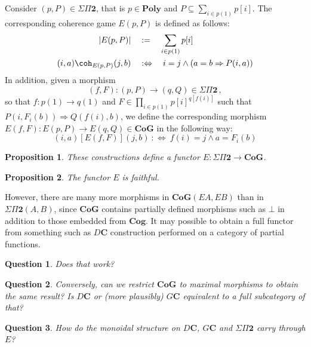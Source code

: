 \documentclass{article}
\newtheorem{proposition}{Proposition}
\newtheorem{question}{Question}
\begin{document}
Consider $(p, P) \in \Sigma \Pi \mathbf{2}$,
that is $p \in \mathbf{Poly}$
and $P \subseteq \sum_{i \in p(1)} p[i]$.
The corresponding coherence game
$E(p, P)$
is defined as follows:
\begin{align*}
  |E (p, P)| \quad &:= \quad \sum_{i \in p(1)} p[i] \\
  (i, a) \coh_{E (p, P)} (j, b) \quad &:\Leftrightarrow\quad
    i = j \wedge (a = b \Rightarrow P(i, a))
\end{align*}
In addition,
given a morphism
\[ (f, F) : (p, P) \rightarrow (q, Q) \in \Sigma\Pi\mathbf{2}\,, \]
so that $f : p(1) \rightarrow q(1)$
and $F \in \prod_{i \in p(1)} p[i]^{q[f(i)]}$
such that $P(i, F_i(b)) \Rightarrow Q(f(i), b)$,
we define the corresponding morphism
$E (f, F) : E (p, P) \rightarrow E (q, Q) \in \mathbf{CoG}$
in the following way:
\[
  (i, a) \mathrel{[E (f, F)]} (j, b)
    \::\Leftrightarrow\:
    f(i) = j \wedge a = F_i(b)
\]

\begin{proposition}
These constructions define a functor
$E : \Sigma\Pi\mathbf{2} \rightarrow \mathbf{CoG}$.
\end{proposition}

\begin{proposition}
The functor $E$ is faithful.
\end{proposition}

However,
there are many more morphisms in $\mathbf{CoG}(E A, E B)$
than in $\Sigma\Pi\mathbf{2}(A, B)$,
since $\mathbf{CoG}$ contains partially defined morphisms
such as $\bot$ in addition to those embedded from $\mathbf{Cog}$.
It may possible to obtain a full functor
from something such as $D \mathbf{C}$ construction
performed on a category of partial functions.

\begin{question}
Does that work?
\end{question}

\begin{question}
Conversely,
can we restrict $\mathbf{CoG}$ to maximal morphisms
to obtain the same result?
Is $D\mathbf{C}$ or (more plausibly) $G\mathbf{C}$
equivalent to a full subcategory of that?
\end{question}

\begin{question}
How do the monoidal structure on
$D\mathbf{C}$,
$G\mathbf{C}$ and
$\Sigma\Pi\mathbf{2}$
carry through $E$?
\end{question}
\end{document}
